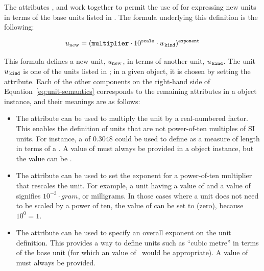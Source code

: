 \newcommand{\ynew}{\ensuremath{y}\xspace}
\newcommand{\ybase}{\ensuremath{y_b}\xspace}
\newcommand{\udef}{\ensuremath{u}\xspace}
\newcommand{\unew}{\ensuremath{u\sub{new}}\xspace}
\newcommand{\ubase}{\ensuremath{u_b}\xspace}
\newcommand{\ukind}{\ensuremath{u_\tokenNC{\,kind}}\xspace}
\newcommand{\uone}{\ensuremath{u_{b_1}}\xspace}
\newcommand{\utwo}{\ensuremath{u_{b_2}}\xspace}
\newcommand{\un}  {\ensuremath{u_{b_n}}\xspace}

The attributes ,  and
 work together to permit the use of \Unit for
expressing new units in terms of the base units listed in
.  The formula underlying this definition
is the following:
\begin{linenomath}
\begin{equation}
  \unew = (\textrm{\tokenNC{multiplier}} \cdot 10^\textrm{\tokenNC{scale}} \cdot \ukind)^\textrm{\tokenNC{exponent}}
\label{eq:unit-semantics}
\end{equation}
\end{linenomath}
This formula defines a new unit, \unew, in terms of another unit,
\ukind.  The unit \ukind is one of the units listed in
; in a given \Unit object, it is
chosen by setting the  attribute.  Each of the other
components on the right-hand side of
Equation~\ref{eq:unit-semantics} corresponds to the remaining
attributes in a \Unit object instance, and their meanings are as
follows:
\begin{itemize}

\item The  attribute can be used to multiply the
   unit by a real-numbered factor.  This enables the
  definition of units that are not power-of-ten multiples of SI
  units.  For instance, a  of 0.3048 could be
  used to define  as a measure of length in terms of a
  .  A value of  must always be
  provided in a \Unit object instance, but the value can be
  .

\item The  attribute can be used to set the exponent
  for a power-of-ten multiplier that rescales the unit.  For
  example, a unit having a  value of  and a
   value of  signifies $10^{-3} \cdot gram$,
  or milligrams.  In those cases where a unit does not need to be
  scaled by a power of ten, the value of  can be set
  to  (zero), because $10^0 = 1$.

\item The  attribute can be used to specify an
  overall exponent on the unit definition.  This provides a way to
  define units such as ``cubic metre'' in terms of the base unit
   (for which an  value of~
  would be appropriate).  A value of  must always
  be provided.

\end{itemize}


